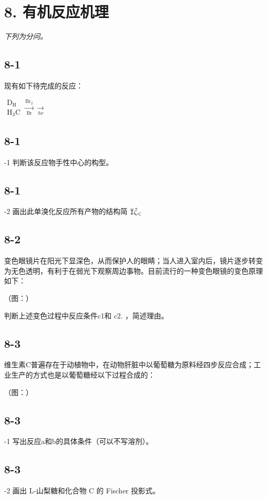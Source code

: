 \section*{8. 有机反应机理}
\textit{下列为分问。}

\subsection*{8-1}
现有如下待完成的反应：

$
\begin{array}{c} \mathrm{D} _ {\mathrm{H}} \\ \mathrm{H} _ {3} \mathrm{C} \end{array} \xrightarrow [ \text {Br} ]{\text {Br} _ {2}} \xrightarrow [ h \nu ]{}
$

\subsection*{8-1}
-1 判断该反应物⼿性中⼼的构型。

\subsection*{8-1}
-2 画出此单溴化反应所有产物的结构简 $\tt { \overline { { I } } } \hat { \zeta } _ { \mathrm { < } }$

\subsection*{8-2}
变⾊眼镜⽚在阳光下显深⾊，从⽽保护⼈的眼睛；当⼈进⼊室内后，镜⽚逐步转变为⽆⾊透明，有利于在弱光下观察周边事物。⽬前流⾏的⼀种变⾊眼镜的变⾊原理如下：

（图：）

判断上述变⾊过程中反应条件c1和 ${ \mathrm { c 2 } } .$ ，简述理由。

\subsection*{8-3}
维⽣素C普遍存在于动植物中，在动物肝脏中以葡萄糖为原料经四步反应合成；⼯业⽣产的⽅式也是以葡萄糖经以下过程合成的：

（图：）

\subsection*{8-3}
-1 写出反应a和b的具体条件（可以不写溶剂）。

\subsection*{8-3}
-2 画出 L-⼭梨糖和化合物 C 的 Fischer 投影式。

